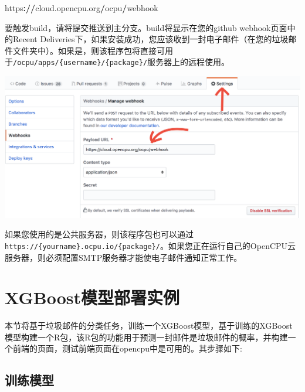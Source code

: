 \documentclass[]{book}
\newenvironment{Shaded}{\begin{snugshade}}{\end{snugshade}}
\newcommand{\OperatorTok}[1]{\textcolor[rgb]{0.81,0.36,0.00}{\textbf{#1}}}
\newcommand{\ErrorTok}[1]{\textcolor[rgb]{0.64,0.00,0.00}{\textbf{#1}}}
\newcommand{\NormalTok}[1]{#1}
\begin{document}
\begin{Shaded}
\begin{Highlighting}[]
\NormalTok{https}\OperatorTok{:}\ErrorTok{//}\NormalTok{cloud.opencpu.org}\OperatorTok{/}\NormalTok{ocpu}\OperatorTok{/}\NormalTok{webhook}
\end{Highlighting}
\end{Shaded}

要触发build，请将提交推送到主分支。build将显示在您的github
webhook页面中的Recent
Deliveries下，如果安装成功，您应该收到一封电子邮件（在您的垃圾邮件文件夹中）。如果是，则该程序包将直接可用于\texttt{/ocpu/apps/\{username\}/\{package\}/}服务器上的远程使用。

\includegraphics{pic/opencpu/p11.png}

如果您使用的是公共服务器，则该程序包也可以通过\texttt{https://\{yourname\}.ocpu.io/\{package\}/}。如果您正在运行自己的OpenCPU云服务器，则必须配置SMTP服务器才能使电子邮件通知正常工作。

\section{XGBoost模型部署实例}\label{xgboost}

本节将基于垃圾邮件的分类任务，训练一个XGBoost模型，基于训练的XGBoost模型构建一个R包，该R包的功能用于预测一封邮件是垃圾邮件的概率，并构建一个前端的页面，测试前端页面在opencpu中是可用的。其步骤如下:

\subsection{训练模型}
\end{document}
